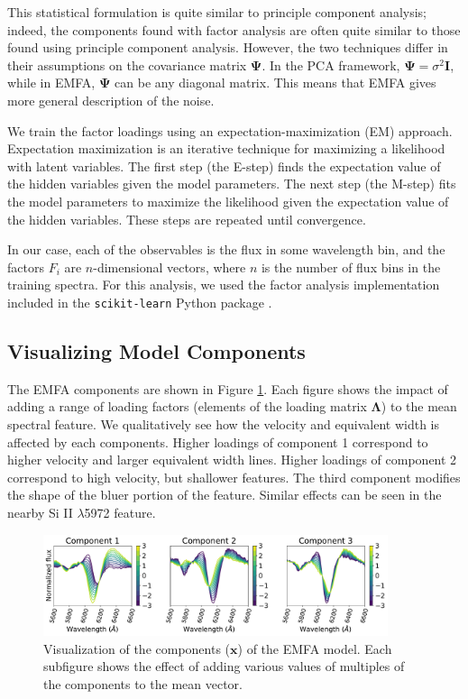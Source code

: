 This statistical formulation is quite similar to principle component analysis; indeed, the components found with factor analysis are often quite similar to those found using principle component analysis. However, the two techniques differ in their assumptions on the covariance matrix $\bm{\Psi}$. In the PCA framework, $\bm{\Psi}=\sigma^2\bm{I}$, while in EMFA, $\bm{\Psi}$ can be any diagonal matrix. This means that EMFA gives more general description of the noise.

We train the factor loadings using an expectation-maximization (EM) approach. Expectation maximization is an iterative technique for maximizing a likelihood with latent variables. The first step (the E-step) finds the expectation value of the hidden variables given the model parameters. The next step (the M-step) fits the model parameters to maximize the likelihood given the expectation value of the hidden variables. These steps are repeated until convergence.

In our case, each of the observables is the flux in some wavelength bin, and the factors $F_i$ are $n$-dimensional vectors, where $n$ is the number of flux bins in the training spectra. For this analysis, we used the factor analysis implementation included in the \verb|scikit-learn| Python package \citep{pedregosa_scikit-learn_2011}.

\subsection{Visualizing Model Components}
The EMFA components are shown in Figure \ref{emfa_components}. Each figure shows the impact of adding a range of loading factors (elements of the loading matrix $\bm{\Lambda}$) to the mean spectral feature. We qualitatively see how the velocity and equivalent width is affected by each components. Higher loadings of component 1 correspond to higher velocity and larger equivalent width lines. Higher loadings of component 2 correspond to high velocity, but shallower features. The third component modifies the shape of the bluer portion of the feature. Similar effects can be seen in the nearby Si II $\lambda$5972 feature.

\begin{figure}[htbp]
    \centering
    \includegraphics[width=0.9\textwidth]{figures/si_feat_pca/model_components.pdf}
    \caption{Visualization of the components ($\bm{x}$) of the EMFA model. Each subfigure shows the effect of adding various values of multiples of the components to the mean vector.}
    \label{emfa_components}
\end{figure}

